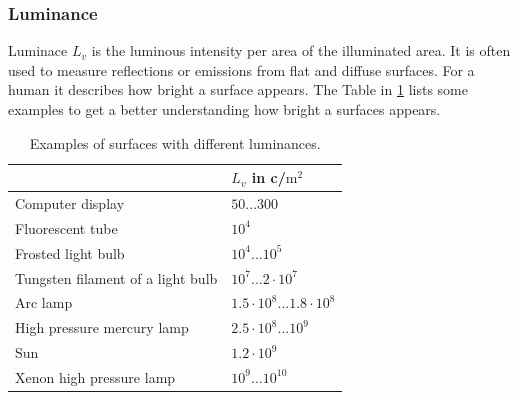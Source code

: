 \subsubsection{Luminance}
Luminace $L_v$ is the luminous intensity per area of the illuminated area. It is often used to measure reflections or emissions from flat and diffuse surfaces.
For a human it describes how bright a surface appears.
The Table in \ref{theory:luminance} lists some examples to get a better understanding how bright a surfaces appears.
\begin{table}[ht]
\begin{tabular}{ |p{11cm}| p{3cm}|  }
	\hline
	& $L_v$ in c/$\text{m}^2$\\
	
	
	\hline
	Computer display					& $50...300$\\
	Fluorescent tube					& $10^4$\\
	Frosted light bulb					& $10^4...10^5$\\
	Tungsten filament of a light bulb	& $10^7...2\cdot 10^7$\\
	Arc lamp							& $1.5\cdot10^8...1.8\cdot10^8$\\
	High pressure mercury lamp			& $2.5\cdot10^8...10^9$\\
	Sun									& $1.2\cdot10^9$\\
	Xenon high pressure lamp			& $10^9...10^10$\\
	
	\hline
\end{tabular}
\caption{Examples of surfaces with different luminances.\label{theory:luminance}}
\end{table}

